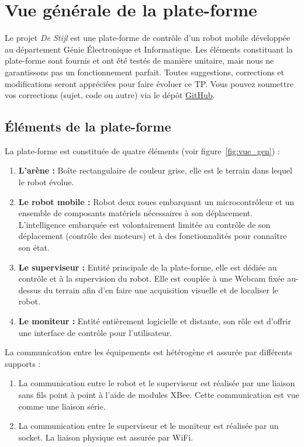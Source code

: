 \section{Vue générale de la plate-forme}

Le projet {\it De Stijl} est une plate-forme de contrôle d'un robot mobile développée au département Génie \'Electronique et Informatique.  Les éléments constituant la plate-forme sont fournis et ont été testés de manière unitaire, mais nous ne garantissons pas un fonctionnement parfait. Toutes suggestions, corrections et modifications seront appréciées pour faire évoluer ce TP. Vous pouvez soumettre vos corrections (sujet, code ou autre) via le dépôt \href{https://github.com/INSA-GEI/dumber/}{GitHub}.

\subsection{\'Eléments de la plate-forme}

La plate-forme est constituée de quatre éléments (voir figure~\ref{fig:vue_gen}) : 
\begin{enumerate}
\item {\bf L'arène :} Boîte rectangulaire de couleur grise, elle est le terrain dans lequel le robot évolue.%
\item {\bf Le robot mobile :} Robot deux roues embarquant un microcontrôleur et un ensemble de composants matériels nécessaires à son déplacement. L'intelligence embarquée est volontairement limitée au contrôle de son déplacement (contrôle des moteurs) et à des fonctionnalités pour connaître son état.
\item {\bf Le superviseur :} Entité principale de la plate-forme, elle est dédiée au contrôle et à la supervision du robot. Elle est couplée à une Webcam fixée au-dessus du terrain afin d'en faire une acquisition visuelle et de localiser le robot.
\item {\bf Le moniteur :} Entité entièrement logicielle et distante, son rôle est d'offrir une interface de contrôle pour l'utilisateur.\\
 \end{enumerate}

La communication entre les équipements est hétérogène et assurée par différents supports :
\begin{enumerate}
\item La communication entre le robot et le superviseur est réalisée par une liaison sans fils point à point à l'aide de modules XBee. Cette communication est vue comme une liaison série.
\item La communication entre le superviseur et le moniteur est réalisée par un socket. La liaison physique est assurée par WiFi.
\end{enumerate}


